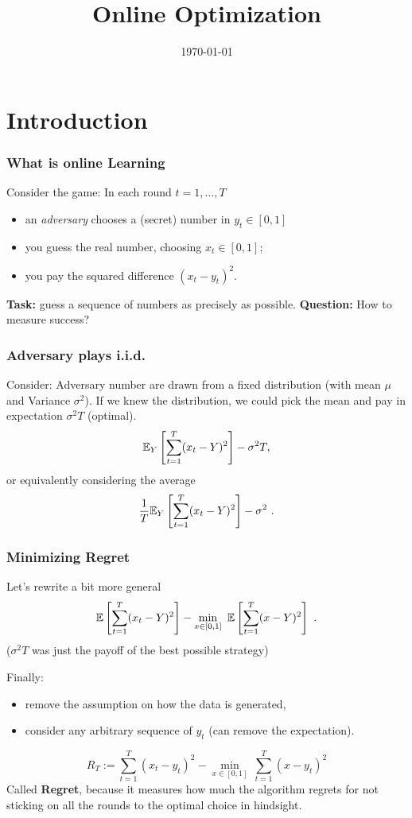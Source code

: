\documentclass{beamer}
\title{Online Optimization}
\date{\today}
\begin{document}
\maketitle
\frame{\tableofcontents}

\section{Introduction}

\begin{frame}
  \frametitle{What is online Learning}
Consider the game: In each round $t=1,\dots,T$
\begin{itemize}
  \item an \textit{adversary} chooses a (secret) number in $y_t \in [0,1]$
  \item you guess the real number, choosing $x_t \in [0,1]$;
  \item you pay the squared difference ${(x_t-y_t)}^2$.
\end{itemize}
\textbf{Task:} guess a sequence of numbers as precisely as possible.
\textbf{Question:} How to measure success?
\end{frame}


\begin{frame}
  \frametitle{Adversary plays i.i.d.}
  Consider: Adversary number are drawn from a fixed distribution (with mean $\mu$ and Variance $\sigma^2$).
  If we knew the distribution, we could pick the mean and pay in expectation $\sigma^2T$ (optimal).
  \begin{equation}
    \label{eq:stoch_regret}
    \mathbb{E}_Y\left[\sum_{t=1}^T (x_t - Y)^2\right] - \sigma^2 T,
  \end{equation}
  or equivalently considering the average
  \begin{equation}
    \label{eq:av_stoch_regret}
    \frac{1}{T}\mathbb{E}_Y\left[\sum_{t=1}^T (x_t - Y)^2\right] - \sigma^2~.
  \end{equation}
\end{frame}


\begin{frame}
  \frametitle{Minimizing Regret}
  Let's rewrite a bit more general
  \[
    \mathbb{E}\left[\sum_{t=1}^T (x_t - Y)^2\right] - \min_{ x \in [0,1]} \ \mathbb{E}\left[\sum_{t=1}^T (x-Y)^2\right]~.
  \]
  ($\sigma^2T$ was just the payoff of the best possible strategy)

  Finally:
  \begin{itemize}
    \item remove the assumption on how the data is generated,
    \item consider any arbitrary sequence of $y_t$
   (can remove the expectation).
  \end{itemize}

  \[
    R_T:=\sum_{t=1}^T (x_t - y_t)^2 - \min_{x \in [0,1]} \ \sum_{t=1}^T (x - y_t)^2
  \]
  Called \textbf{Regret}, because it measures how much the algorithm regrets for not sticking on all the rounds to the optimal choice in hindsight.
\end{frame}
\end{document}
